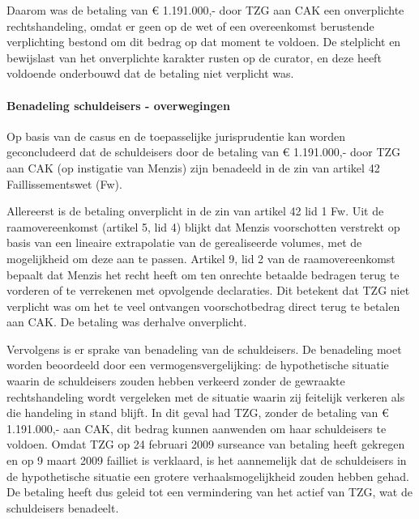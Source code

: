 \documentclass[
  dutch,
  a4paper,
]{article}
\begin{document}
Daarom was de betaling van € 1.191.000,- door TZG aan CAK een onverplichte rechtshandeling, omdat er geen op de wet of een overeenkomst berustende verplichting bestond om dit bedrag op dat moment te voldoen. De stelplicht en bewijslast van het onverplichte karakter rusten op de curator, en deze heeft voldoende onderbouwd dat de betaling niet verplicht was.

\paragraph{Benadeling schuldeisers - overwegingen}\label{benadeling-schuldeisers---overwegingen-87}

Op basis van de casus en de toepasselijke jurisprudentie kan worden geconcludeerd dat de schuldeisers door de betaling van € 1.191.000,- door TZG aan CAK (op instigatie van Menzis) zijn benadeeld in de zin van artikel 42 Faillissementswet (Fw).

Allereerst is de betaling onverplicht in de zin van artikel 42 lid 1 Fw. Uit de raamovereenkomst (artikel 5, lid 4) blijkt dat Menzis voorschotten verstrekt op basis van een lineaire extrapolatie van de gerealiseerde volumes, met de mogelijkheid om deze aan te passen. Artikel 9, lid 2 van de raamovereenkomst bepaalt dat Menzis het recht heeft om ten onrechte betaalde bedragen terug te vorderen of te verrekenen met opvolgende declaraties. Dit betekent dat TZG niet verplicht was om het te veel ontvangen voorschotbedrag direct terug te betalen aan CAK. De betaling was derhalve onverplicht.

Vervolgens is er sprake van benadeling van de schuldeisers. De benadeling moet worden beoordeeld door een vermogensvergelijking: de hypothetische situatie waarin de schuldeisers zouden hebben verkeerd zonder de gewraakte rechtshandeling wordt vergeleken met de situatie waarin zij feitelijk verkeren als die handeling in stand blijft. In dit geval had TZG, zonder de betaling van € 1.191.000,- aan CAK, dit bedrag kunnen aanwenden om haar schuldeisers te voldoen. Omdat TZG op 24 februari 2009 surseance van betaling heeft gekregen en op 9 maart 2009 failliet is verklaard, is het aannemelijk dat de schuldeisers in de hypothetische situatie een grotere verhaalsmogelijkheid zouden hebben gehad. De betaling heeft dus geleid tot een vermindering van het actief van TZG, wat de schuldeisers benadeelt.
\end{document}
